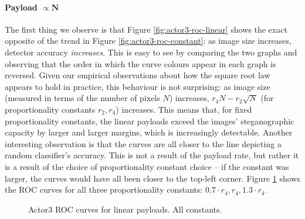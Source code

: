 \documentclass[11pt,a4paper,twoside,openright]{report}
\begin{document}
\paragraph{Payload $\bm{\propto N}$} The first thing we observe is that Figure \ref{fig:actor3-roc-linear} shows the exact opposite of the trend in Figure \ref{fig:actor3-roc-constant}: as image size increases, detector accuracy \textit{increases}. This is easy to see by comparing the two graphs and observing that the order in which the curve colours appear in each graph is reversed. Given our empirical observations about how the square root law appears to hold in practice, this behaviour is not surprising: as image size (measured in terms of the number of pixels $N$) increases, $r_4N - r_2\sqrt{N}$ (for proportionality constants $r_2, r_4$) increases. This means that, for fixed proportionality constants, the linear payloads exceed the images' steganographic capacity by larger and larger margins, which is increasingly detectable. Another interesting observation is that the curves are all closer to the line depicting a random classifier's accuracy. This is not a result of the payload rate, but rather it is a result of the choice of proportionality constant choice -- if the constant was larger, the curves would have all been closer to the top-left corner. Figure \ref{fig:actor3-roc-linear-all-constants} shows the ROC curves for all three proportionality constants: $0.7 \cdot r_4, r_4, 1.3 \cdot r_4$.

\begin{figure}[htbp]
    \centering
    \caption{Actor3 ROC curves for linear payloads. All constants.}
    \label{fig:actor3-roc-linear-all-constants}
\end{figure}
\end{document}

